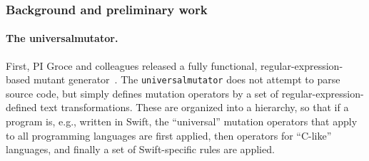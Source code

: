 \subsubsection{Background and preliminary work}




\paragraph{The universalmutator.} First, PI Groce and colleagues
released a fully functional, regular-expression-based mutant
generator~\cite{regexpMut,universalmutator}.
The {\tt universalmutator}
does not attempt to parse source code, but simply defines mutation
operators by a set of regular-expression-defined text transformations.  These
are organized into a hierarchy, so that if a program is, e.g., written in Swift,
the ``universal'' mutation operators that apply to all programming languages are
first applied, then operators for ``C-like'' languages, and finally a set of
Swift-specific rules are applied.  %

